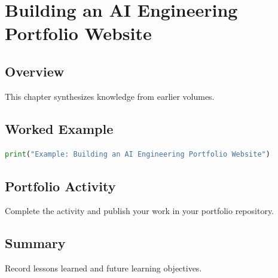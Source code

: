 \chapter{Building an AI Engineering Portfolio Website}
\label{chap:vol15-4}



\section{Overview}
This chapter synthesizes knowledge from earlier volumes.

\section{Worked Example}
\begin{lstlisting}[language=Python]
print("Example: Building an AI Engineering Portfolio Website")
\end{lstlisting}

\section{Portfolio Activity}
Complete the activity and publish your work in your portfolio repository.

\section{Summary}
Record lessons learned and future learning objectives.

